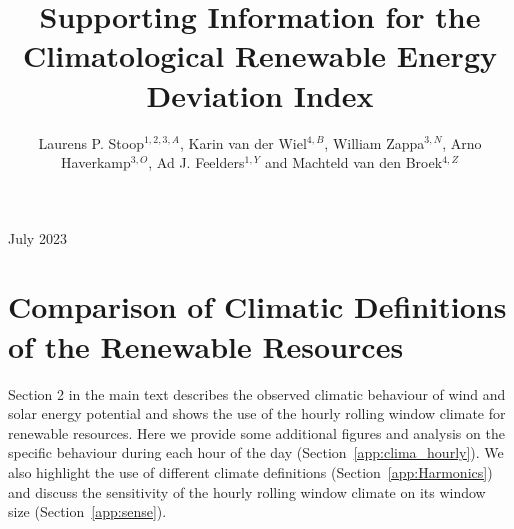 \documentclass[12pt]{iopart}
\begin{document}
\title[Supp. Inf. to the Climatological Renewable Energy Deviation Index]{Supporting Information for the Climatological Renewable Energy Deviation Index}

\author{Laurens P. Stoop$^{1,2,3,A}$, Karin van der Wiel$^{4,B}$, William Zappa$^{3,N}$, Arno Haverkamp$^{3,O}$, Ad J. Feelders$^{1,Y}$ and Machteld van den Broek$^{4,Z}$}

\address{$^1$ Information and Computing Science, Utrecht University, the Netherlands}
\address{$^2$ Copernicus Institute of Sustainable Development, Utrecht University, the Netherlands}
\address{$^3$ TenneT TSO B.V., Arnhem, the Netherlands}
\address{$^4$ Royal Netherlands Meteorological Institute (KNMI), the Netherlands}
\address{$^5$ Integrated Research on Energy, Environment and Society, Energy and Sustainability Research Institute Groningen (ESRIG), University of Groningen, the Netherlands}


\vspace{10pt}
\begin{indented}
\item[]July 2023
\end{indented}

\submitto{\ERL}

\maketitle





\section{Comparison of Climatic Definitions of the Renewable Resources}
Section 2 in the main text describes the observed climatic behaviour of wind and solar energy potential and shows the use of the hourly rolling window climate for renewable resources. 
Here we provide some additional figures and analysis on the specific behaviour during each hour of the day (Section~\ref{app:clima_hourly}). 
We also highlight the use of different climate definitions (Section~\ref{app:Harmonics}) and discuss the sensitivity of the hourly rolling window climate on its window size (Section~\ref{app:sense}).
\end{document}

